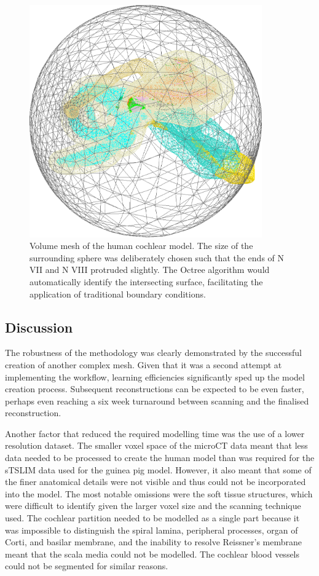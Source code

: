 \begin{figure}[t]
	\centering
	\includegraphics[width=10cm]{Methodology/hm_mesh}
	\caption[Volume mesh of the human cochlear model]{Volume mesh of the human
	cochlear model. The size of the surrounding sphere was deliberately chosen
	such that the ends of N VII and N VIII protruded slightly. The
	Octree algorithm would automatically identify the intersecting surface,
	facilitating the application of traditional boundary conditions.}
	\label{fig:human_model_mesh}
\end{figure}

\subsection{Discussion}

The robustness of the methodology was clearly demonstrated by the successful
creation of another complex mesh. Given that it was a second attempt at
implementing the workflow, learning efficiencies significantly sped up the model
creation process. Subsequent reconstructions can be expected to be even faster,
perhaps even reaching a six week turnaround between scanning and the finalised
reconstruction.

Another factor that reduced the required modelling time was the use of a lower
resolution dataset. The smaller voxel space of the microCT data meant that less
data needed to be processed to create the human model than was required for the
sTSLIM data used for the guinea pig model. However, it also meant that some of
the finer anatomical details were not visible and thus could not be incorporated
into the model. The most notable omissions were the soft tissue structures,
which were difficult to identify given the larger voxel size and the scanning
technique used. The cochlear partition needed to be modelled as a single part
because it was impossible to distinguish the spiral lamina, peripheral
processes, organ of Corti, and basilar membrane, and the inability to resolve
Reissner's membrane meant that the scala media could not be modelled. The
cochlear blood vessels could not be segmented for similar reasons.

